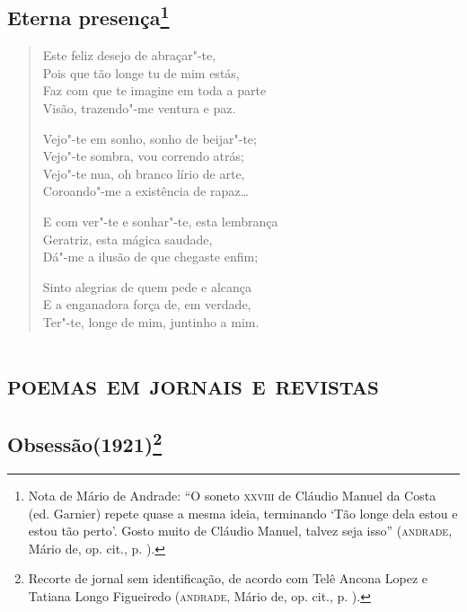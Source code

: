 \pagebreak
\section{Eterna presença\footnote[*]{Nota de Mário de Andrade: ``O soneto
  \textsc{xxviii} de Cláudio Manuel da Costa (ed. Garnier) repete quase a mesma
  ideia, terminando `Tão longe dela estou e estou tão perto'. Gosto
  muito de Cláudio Manuel, talvez seja isso'' (\textsc{andrade}, Mário de, op.
  cit., p. ).}}

\begin{verse}
Este feliz desejo de abraçar"-te,\\
Pois que tão longe tu de mim estás,\\
Faz com que te imagine em toda a parte\\
Visão, trazendo"-me ventura e paz.

Vejo"-te em sonho, sonho de beijar"-te;\\
Vejo"-te sombra, vou correndo atrás;\\
Vejo"-te nua, oh branco lírio de arte,\\
Coroando"-me a existência de rapaz\ldots{}

E com ver"-te e sonhar"-te, esta lembrança\\
Geratriz, esta mágica saudade,\\
Dá"-me a ilusão de que chegaste enfim;

Sinto alegrias de quem pede e alcança\\
E a enganadora força de, em verdade,\\
Ter"-te, longe de mim, juntinho a mim.
\end{verse}

\chapter{\textsc{poemas em jornais e revistas}}

\section[Obsessão]{Obsessão\break(1921)\footnote[*]{Recorte de jornal sem identificação, de
  acordo com Telê Ancona Lopez e Tatiana Longo Figueiredo (\textsc{andrade},
  Mário de, op. cit., p. ).}}


